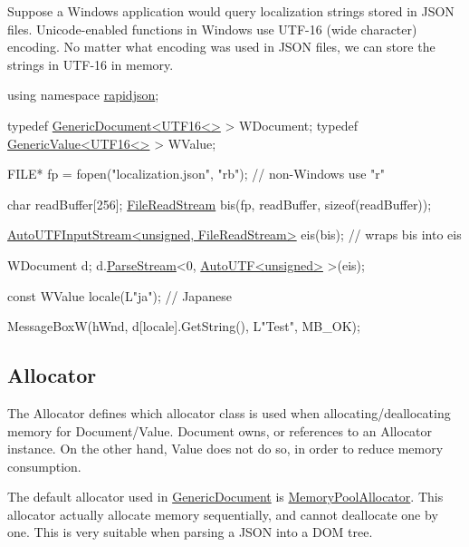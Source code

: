 Suppose a Windows application would query localization strings stored in J\+S\+ON files. Unicode-\/enabled functions in Windows use U\+T\+F-\/16 (wide character) encoding. No matter what encoding was used in J\+S\+ON files, we can store the strings in U\+T\+F-\/16 in memory.


\begin{DoxyCode}
\textcolor{keyword}{using namespace }\hyperlink{namespacerapidjson}{rapidjson};

\textcolor{keyword}{typedef} \hyperlink{class_generic_document}{GenericDocument<UTF16<>} > WDocument;
\textcolor{keyword}{typedef} \hyperlink{class_generic_value}{GenericValue<UTF16<>} > WValue;

FILE* fp = fopen(\textcolor{stringliteral}{"localization.json"}, \textcolor{stringliteral}{"rb"}); \textcolor{comment}{// non-Windows use "r"}

\textcolor{keywordtype}{char} readBuffer[256];
\hyperlink{class_file_read_stream}{FileReadStream} bis(fp, readBuffer, \textcolor{keyword}{sizeof}(readBuffer));

\hyperlink{class_auto_u_t_f_input_stream}{AutoUTFInputStream<unsigned, FileReadStream>} eis(bis);  \textcolor{comment}{//
       wraps bis into eis}

WDocument d;
d.\hyperlink{class_generic_document_afe94c0abc83a20f2d7dc1ba7677e6238}{ParseStream}<0, \hyperlink{struct_auto_u_t_f}{AutoUTF<unsigned>} >(eis);

\textcolor{keyword}{const} WValue locale(L\textcolor{stringliteral}{"ja"}); \textcolor{comment}{// Japanese}

MessageBoxW(hWnd, d[locale].GetString(), L\textcolor{stringliteral}{"Test"}, MB\_OK);
\end{DoxyCode}
\hypertarget{md_Commun_Externe_RapidJSON_doc_internals_Allocator}{}\subsection{Allocator}\label{md_Commun_Externe_RapidJSON_doc_internals_Allocator}
The {\ttfamily Allocator} defines which allocator class is used when allocating/deallocating memory for {\ttfamily Document}/{\ttfamily Value}. {\ttfamily Document} owns, or references to an {\ttfamily Allocator} instance. On the other hand, {\ttfamily Value} does not do so, in order to reduce memory consumption.

The default allocator used in {\ttfamily \hyperlink{class_generic_document}{Generic\+Document}} is {\ttfamily \hyperlink{class_memory_pool_allocator}{Memory\+Pool\+Allocator}}. This allocator actually allocate memory sequentially, and cannot deallocate one by one. This is very suitable when parsing a J\+S\+ON into a D\+OM tree.

